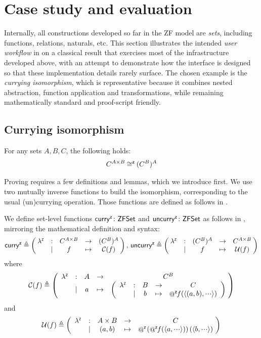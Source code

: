 \section{Case study and evaluation}
\label{sec:zflean-case-study}

Internally, all constructions developed so far in the ZF model are \emph{sets}, including functions, relations, naturals, etc.
This section illustrates the intended \emph{user workflow} in \zflean{} on a classical result that exercises most of the infrastructure developed above, with an attempt to demonstrate how the interface is designed so that these implementation details rarely surface.
The chosen example is the \emph{currying isomorphism}, which is representative because it combines nested abstraction, function application and transformations, while remaining mathematically standard and proof-script friendly.

\subsection{Currying isomorphism}

\begin{theorem}
  \label{thm:isIso_curry}
  For any sets $A,B,C$, the following holds:
  \begin{equation*}
    C^{A\times B} \mathbin{\mathsf{\cong}^{\mathsf{z}}} (C^B)^A
  \end{equation*}
\end{theorem}
%
Proving  requires a few definitions and lemmas, which we introduce first.
We use two mutually inverse functions to build the isomorphism, corresponding to the usual (un)currying operation. Those functions are defined as follows in \zflean.
%
\begin{definition}
  We define set-level functions $\mathop{\mathsf{\mathsf{curry}}^{\mathsf{z}}} \colon \mathsf{ZFSet}$ and $\mathop{\mathsf{\mathsf{uncurry}}^{\mathsf{z}}} \colon \mathsf{ZFSet}$ as follows in \zflean, mirroring the mathematical definition and syntax:
  \begin{equation*}
    \mathop{\mathsf{\mathsf{curry}}^{\mathsf{z}}} \triangleq \left(\mkern-5mu \begin{array}{ccccc} \lambda^{\scriptscriptstyle{\mathsf{Z}}} & : & C^{A \times B} & \to & (C^B)^A \\ & \mid & f & \mapsto & \mathcal{C}(f) \end{array} \mkern-5mu\right),\,
    \mathop{\mathsf{\mathsf{uncurry}}^{\mathsf{z}}} \triangleq \left(\mkern-5mu \begin{array}{ccccc} \lambda^{\scriptscriptstyle{\mathsf{Z}}} & : & (C^B)^A & \to & C^{A \times B} \\ & \mid & f & \mapsto & \mathcal{U}(f) \end{array} \mkern-5mu\right)
  \end{equation*}
  where
  \begin{equation*}
    \mathcal{C}(f) \triangleq \left(\zlambda{A}{C^B}{a}{\left(\zlambda{B}{C}{b}{\fapply{f}{\langle (a, b), \irrelprf \rangle}}\right)}\!\right)
  \end{equation*}
  and
  \begin{equation*}
    \mathcal{U}(f) \triangleq \left(\zlambda{A \times B}{C}{(a,b)}{\fapply{\left(\fapply{f}{\langle a, \irrelprf \rangle}\right)}{\langle b, \irrelprf \rangle}}\!\right)
  \end{equation*}
\end{definition}

